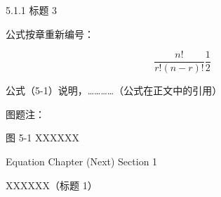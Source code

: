 \documentclass[UTF8, scheme=chinese, openany, oneside]{ctexbook}
\begin{document}

\vspace{0.3cm}
\noindent \hspace{2em} { 5.1.1 \quad 标题 3}

\vspace{1.2cm}

\noindent \hspace{2em} 公式按章重新编号：

\vspace{0.6cm}

\begin{equation}
\frac{n!}{r!(n-r)!} \frac{1}{2} \tag{5-1} \label{eq:5-1}
\end{equation}

\vspace{1.8cm}

\noindent \hspace{2em} 公式（5-1）说明，…………（公式在正文中的引用）

\vspace{3.5cm}

\noindent \hspace{2em} 图题注：

\vspace{0.8cm}

\begin{center}
 图 5-1 \quad XXXXXX
\end{center}

\newpage
{}
\vspace*{5cm}
\begin{center}
{\color{white} Equation Chapter (Next) Section 1}
\end{center}
\clearpage
\setcounter{chapter}{5} 
\setcounter{page}{14}    


\vspace{1cm}
\begin{center}
{ \quad XXXXXX（标题 1）}
\end{center}
\vspace{0.8cm}
\end{document}
